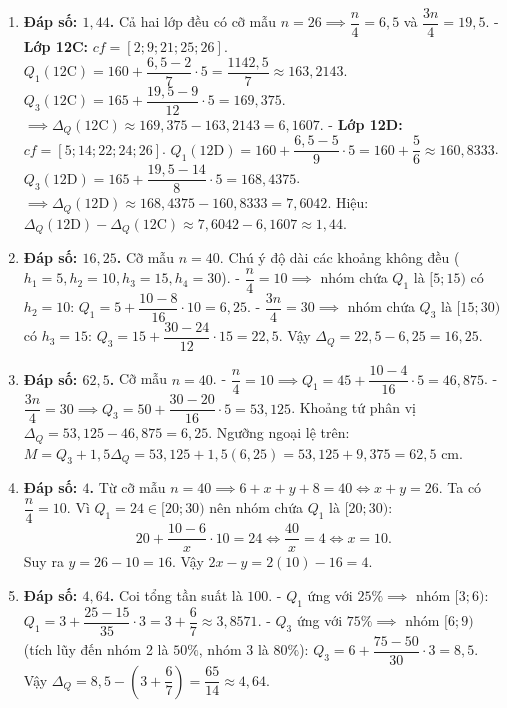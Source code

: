 \documentclass[12pt,a4paper]{article}
\begin{document}
\begin{enumerate}[start=11]
\item \textbf{Đáp số: $1{,}44$.}  
Cả hai lớp đều có cỡ mẫu $n = 26 \implies \dfrac{n}{4} = 6{,}5$ và $\dfrac{3n}{4} = 19{,}5$.  
- \textbf{Lớp 12C:} $cf = [2; 9; 21; 25; 26]$.  
  $Q_1(12\text{C}) = 160 + \dfrac{6{,}5 - 2}{7} \cdot 5 = \dfrac{1142{,}5}{7} \approx 163{,}2143$.  
  $Q_3(12\text{C}) = 165 + \dfrac{19{,}5 - 9}{12} \cdot 5 = 169{,}375$.  
  $\implies \Delta_Q(12\text{C}) \approx 169{,}375 - 163{,}2143 = 6{,}1607$.  
- \textbf{Lớp 12D:} $cf = [5; 14; 22; 24; 26]$.  
  $Q_1(12\text{D}) = 160 + \dfrac{6{,}5 - 5}{9} \cdot 5 = 160 + \dfrac{5}{6} \approx 160{,}8333$.  
  $Q_3(12\text{D}) = 165 + \dfrac{19{,}5 - 14}{8} \cdot 5 = 168{,}4375$.  
  $\implies \Delta_Q(12\text{D}) \approx 168{,}4375 - 160{,}8333 = 7{,}6042$.  
Hiệu: $\Delta_Q(12\text{D}) - \Delta_Q(12\text{C}) \approx 7{,}6042 - 6{,}1607 \approx 1{,}44$.

\item \textbf{Đáp số: $16{,}25$.}  
Cỡ mẫu $n = 40$. Chú ý độ dài các khoảng không đều ($h_1=5, h_2=10, h_3=15, h_4=30$).  
- $\dfrac{n}{4} = 10 \implies$ nhóm chứa $Q_1$ là $[5; 15)$ có $h_2 = 10$: $Q_1 = 5 + \dfrac{10 - 8}{16} \cdot 10 = 6{,}25$.  
- $\dfrac{3n}{4} = 30 \implies$ nhóm chứa $Q_3$ là $[15; 30)$ có $h_3 = 15$: $Q_3 = 15 + \dfrac{30 - 24}{12} \cdot 15 = 22{,}5$.  
Vậy $\Delta_Q = 22{,}5 - 6{,}25 = 16{,}25$.

\item \textbf{Đáp số: $62{,}5$.}  
Cỡ mẫu $n = 40$.  
- $\dfrac{n}{4} = 10 \implies Q_1 = 45 + \dfrac{10 - 4}{16} \cdot 5 = 46{,}875$.  
- $\dfrac{3n}{4} = 30 \implies Q_3 = 50 + \dfrac{30 - 20}{16} \cdot 5 = 53{,}125$.  
Khoảng tứ phân vị $\Delta_Q = 53{,}125 - 46{,}875 = 6{,}25$.  
Ngưỡng ngoại lệ trên: $M = Q_3 + 1{,}5\Delta_Q = 53{,}125 + 1{,}5(6{,}25) = 53{,}125 + 9{,}375 = 62{,}5\text{ cm}$.

\item \textbf{Đáp số: $4$.}  
Từ cỡ mẫu $n = 40 \implies 6 + x + y + 8 = 40 \iff x + y = 26$.  
Ta có $\dfrac{n}{4} = 10$. Vì $Q_1 = 24 \in [20; 30)$ nên nhóm chứa $Q_1$ là $[20; 30)$:  
\[
20 + \dfrac{10 - 6}{x} \cdot 10 = 24 \iff \dfrac{40}{x} = 4 \iff x = 10.
\]
Suy ra $y = 26 - 10 = 16$. Vậy $2x - y = 2(10) - 16 = 4$.

\item \textbf{Đáp số: $4{,}64$.}  
Coi tổng tần suất là $100$.  
- $Q_1$ ứng với $25\% \implies$ nhóm $[3; 6)$: $Q_1 = 3 + \dfrac{25 - 15}{35} \cdot 3 = 3 + \dfrac{6}{7} \approx 3{,}8571$.  
- $Q_3$ ứng với $75\% \implies$ nhóm $[6; 9)$ (tích lũy đến nhóm 2 là $50\%$, nhóm 3 là $80\%$): $Q_3 = 6 + \dfrac{75 - 50}{30} \cdot 3 = 8{,}5$.  
Vậy $\Delta_Q = 8{,}5 - \left(3 + \dfrac{6}{7}\right) = \dfrac{65}{14} \approx 4{,}64$.


\end{enumerate}
\end{document}
